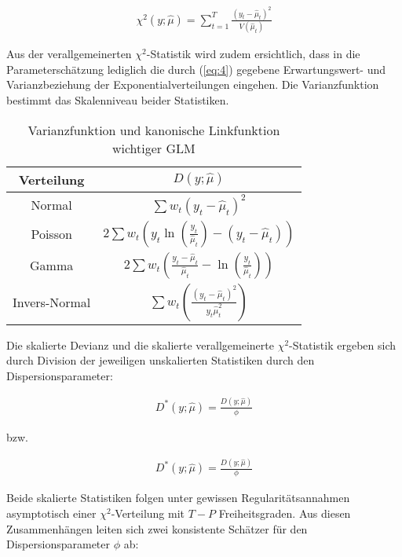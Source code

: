 \begin{eqnarray}
\chi^2(y;\hat{\mu})= \sum_{t=1}^T  \frac{(y_t-\hat{\mu}_t)^2}{V(\hat{\mu}_t)}
\end{eqnarray}

Aus der verallgemeinerten  $\chi^2$-Statistik wird zudem ersichtlich, dass in die Parameterschätzung lediglich die durch (\ref{eq:4}) gegebene Erwartungswert- und Varianzbeziehung der Exponentialverteilungen eingehen. Die Varianzfunktion bestimmt das Skalenniveau beider Statistiken.

\begin{table}
 \caption{Varianzfunktion und kanonische Linkfunktion wichtiger GLM}

\begin{center}
\begin{tabular}{c|c}
Verteilung         &  $D(y;\hat{\mu})$    \\ \hline
Normal		  &  $ \sum w_t(y_t - \hat{\mu}_t)^2 $                 \\
Poisson		  &  $ 2 \sum w_t\left(y_t \ln (\frac{y_t}{ \hat{\mu}_t}) - (y_t - \hat{\mu}_t)\right)  $           \\
Gamma		  &  $ 2 \sum w_t\left(\frac{y_t - \hat{\mu}_t}{ \hat{\mu}_t} - \ln (\frac{y_t}{\hat{\mu}_t})\right)  $         \\
Invers-Normal	  &  $  \sum w_t \left( \frac{(y_t-\hat{\mu}_t)^2}{y_t\hat{\mu}_t^2}     \right)     $  \\


\end{tabular}
\end{center}

\label{tab:Devianzfunktion}
 \end{table}


Die skalierte Devianz und die skalierte verallgemeinerte $\chi^2$-Statistik ergeben sich durch Division der jeweiligen unskalierten Statistiken durch den Dispersionsparameter:


\begin{eqnarray} \label{eq:6a}
D^*(y;\hat{\mu})=\frac{D(y;\hat{\mu})}{\phi}           
\end{eqnarray}

bzw.


\begin{eqnarray}\label{eq:6b}
D^*(y;\hat{\mu})=\frac{D(y;\hat{\mu})}{\phi}          
\end{eqnarray}

Beide skalierte Statistiken folgen unter gewissen Regularitätsannahmen asymptotisch einer  $\chi^2$-Verteilung mit $T-P$  Freiheitsgraden. Aus diesen Zusammenhängen leiten sich zwei konsistente Schätzer für den Dispersionsparameter $\phi$  ab:

